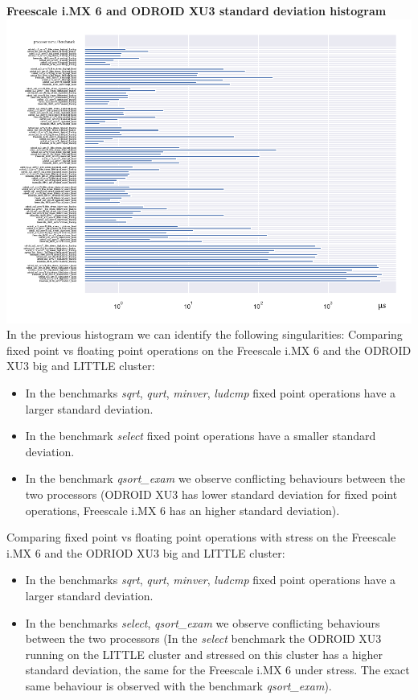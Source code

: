 \clearpage
\textbf{Freescale i.MX 6 and ODROID XU3 standard deviation histogram}\newline
\hspace*{-3.2cm}
\includegraphics[width=570pt]{boards_stddev_histogram.pdf}
\clearpage
In the previous histogram we can identify the following singularities:
Comparing fixed point vs floating point operations on the Freescale i.MX 6 and the ODROID XU3 big and LITTLE cluster:
\begin{itemize}
		\item In the benchmarks \textit{sqrt}, \textit{qurt}, \textit{minver}, \textit{ludcmp} fixed point operations have a larger standard deviation.
		\item In the benchmark \textit{select} fixed point operations have a smaller standard deviation.
		\item In the benchmark \textit{qsort\_exam} we observe conflicting behaviours between the two processors (ODROID XU3 has lower standard deviation for fixed point operations, Freescale i.MX 6 has an higher standard deviation).
\end{itemize}
Comparing fixed point vs floating point operations with stress on the Freescale i.MX 6 and the ODRIOD XU3 big and LITTLE cluster:
\begin{itemize}
		\item In the benchmarks \textit{sqrt}, \textit{qurt}, \textit{minver}, \textit{ludcmp} fixed point operations have a larger standard deviation.
		\item In the benchmarks \textit{select}, \textit{qsort\_exam} we observe conflicting behaviours between the two processors (In the \textit{select} benchmark the ODROID XU3 running on the LITTLE cluster and stressed on this cluster has a higher standard deviation, the same for the Freescale i.MX 6 under stress. The exact same behaviour is observed with the benchmark \textit{qsort\_exam}).
\end{itemize}

